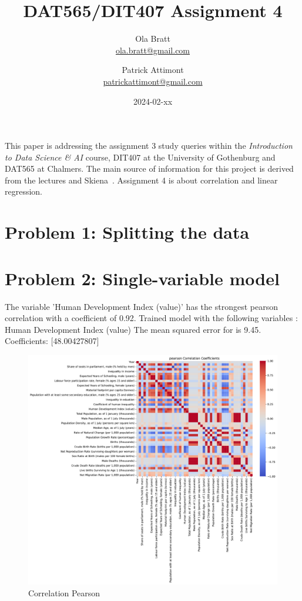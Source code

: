 \documentclass[a4paper]{article}
\begin{document}
\author{Ola Bratt \\
  \href{mailto:ola.bratt@gmail.com}{ola.bratt@gmail.com}
  \and
  Patrick Attimont \\
  \href{patrickattimont@gmail.com}{patrickattimont@gmail.com}
}

\title{DAT565/DIT407 Assignment 4}
\date{2024-02-xx}

\maketitle

This paper is addressing the assignment 3 study queries within the \emph{Introduction to Data Science \& AI} course, DIT407 at 
the University of Gothenburg and DAT565 at Chalmers. The main source of information for this project
is derived from the lectures and Skiena~\cite{Skiena:2024}. Assignment 4 is about correlation and linear regression.

\section*{Problem 1: Splitting the data}



\section*{Problem 2: Single-variable model}
The variable 'Human Development Index (value)' has the strongest pearson correlation with a coefficient of 0.92.
Trained model with the following variables :  Human Development Index (value)
The mean squared error for is 9.45.
Coefficients:  [48.00427807]


\begin{figure}[h]
  \begin{center}
    \includegraphics[width=\textwidth]{ola/pearson_correlation.pdf}
    \caption{Correlation Pearson}
    \label{fig:pearson_correlation}
  \end{center}
\end{figure}
\end{document}
